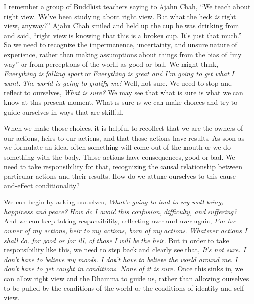 I remember a group of Buddhist teachers saying to Ajahn Chah, ``We 
teach about right view. We've been studying about right view. But what 
the heck \emph{is} right view, anyway?'' Ajahn Chah smiled and held up 
the cup he was drinking from and said, ``right view is knowing that 
this is a broken cup. It's just that much.'' So we need to recognize 
the impermanence, uncertainty, and unsure nature of experience, rather 
than making assumptions about things from the bias of ``my way'' or 
from perceptions of the world as good or bad. We might think, 
\emph{Everything is falling apart} or \emph{Everything is great and I'm 
going to get what I want. The world is going to gratify me!} Well, not 
sure. We need to stop and reflect to ourselves, \emph{What is sure?} We 
may see that what is sure is what we can know at this present moment. 
What is sure is we can make choices and try to guide ourselves in ways 
that are skillful.

When we make those choices, it is helpful to recollect that we are the 
owners of our actions, heirs to our actions, and that those actions 
have results. As soon as we formulate an idea, often something will 
come out of the mouth or we do something with the body. Those actions 
have consequences, good or bad. We need to take responsibility for 
that, recognizing the causal relationship between particular actions 
and their results. How do we attune ourselves to this cause-and-effect 
conditionality?

We can begin by asking ourselves, \emph{What's going to lead to my 
well-being, happiness and peace? How do I avoid this confusion, 
difficulty, and suffering?} And we can keep taking responsibility, 
reflecting over and over again, \emph{I'm the owner of my actions, heir 
to my actions, born of my actions. Whatever actions I shall do, for 
good or for ill, of those I will be the heir.} But in order to take 
responsibility like this, we need to step back and clearly see that, 
\emph{It's not sure. I don't have to believe my moods. I don't have to 
believe the world around me. I don't have to get caught in conditions. 
None of it is sure.} Once this sinks in, we can allow right view and 
the Dhamma to guide us, rather than allowing ourselves to be pulled by 
the conditions of the world or the conditions of identity and self view.


